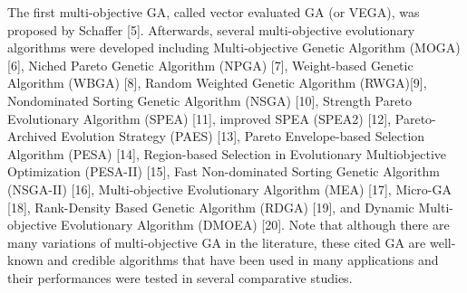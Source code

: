 The first multi-objective GA, called vector evaluated GA (or VEGA), was proposed by Schaffer [5]. Afterwards, several multi-objective evolutionary algorithms were developed including Multi-objective Genetic Algorithm (MOGA) [6], Niched Pareto Genetic Algorithm (NPGA) [7], Weight-based Genetic Algorithm (WBGA) [8], Random Weighted Genetic Algorithm (RWGA)[9], Nondominated Sorting Genetic Algorithm (NSGA) [10], Strength Pareto Evolutionary Algorithm (SPEA) [11], improved SPEA (SPEA2) [12], Pareto-Archived Evolution Strategy (PAES) [13], Pareto Envelope-based Selection Algorithm (PESA) [14], Region-based Selection in Evolutionary Multiobjective Optimization (PESA-II) [15], Fast Non-dominated Sorting Genetic Algorithm (NSGA-II) [16], Multi-objective Evolutionary Algorithm (MEA) [17], Micro-GA [18], Rank-Density Based Genetic Algorithm (RDGA) [19], and Dynamic Multi-objective Evolutionary Algorithm (DMOEA) [20]. Note that although there are many variations of multi-objective GA in the literature, these cited GA are well-known and credible algorithms that have been used in many applications and their performances were tested in several comparative studies.
